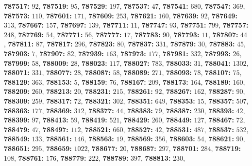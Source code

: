 \textsf{\bfseries 787517:} $92$, \textsf{\bfseries 787519:} $95$, \textsf{\bfseries 787529:} $197$, \textsf{\bfseries 787537:} $47$, \textsf{\bfseries 787541:} $680$, \textsf{\bfseries 787547:} $369$, \textsf{\bfseries 787573:} $110$, \textsf{\bfseries 787601:} $171$, \textsf{\bfseries 787609:} $253$, \textsf{\bfseries 787621:} $160$, \textsf{\bfseries 787639:} $92$, \textsf{\bfseries 787649:} $313$, \textsf{\bfseries 787667:} $157$, \textsf{\bfseries 787697:} $139$, \textsf{\bfseries 787711:} $11$, \textsf{\bfseries 787747:} $93$, \textsf{\bfseries 787751:} $799$, \textsf{\bfseries 787757:} $248$, \textsf{\bfseries 787769:} $54$, \textsf{\bfseries 787771:} $56$, \textsf{\bfseries 787777:} $17$, \textsf{\bfseries 787783:} $90$, \textsf{\bfseries 787793:} $11$, \textsf{\bfseries 787807:} $44$, \textsf{\bfseries 787811:} $87$, \textsf{\bfseries 787817:} $296$, \textsf{\bfseries 787823:} $80$, \textsf{\bfseries 787837:} $331$, \textsf{\bfseries 787879:} $30$, \textsf{\bfseries 787883:} $45$, \textsf{\bfseries 787903:} $7$, \textsf{\bfseries 787907:} $82$, \textsf{\bfseries 787939:} $163$, \textsf{\bfseries 787973:} $177$, \textsf{\bfseries 787981:} $332$, \textsf{\bfseries 787993:} $26$, \textsf{\bfseries 787999:} $58$, \textsf{\bfseries 788009:} $28$, \textsf{\bfseries 788023:} $117$, \textsf{\bfseries 788027:} $783$, \textsf{\bfseries 788033:} $31$, \textsf{\bfseries 788041:} $1302$, \textsf{\bfseries 788071:} $331$, \textsf{\bfseries 788077:} $28$, \textsf{\bfseries 788087:} $58$, \textsf{\bfseries 788089:} $271$, \textsf{\bfseries 788093:} $78$, \textsf{\bfseries 788107:} $75$, \textsf{\bfseries 788129:} $363$, \textsf{\bfseries 788153:} $5$, \textsf{\bfseries 788159:} $76$, \textsf{\bfseries 788167:} $209$, \textsf{\bfseries 788173:} $164$, \textsf{\bfseries 788189:} $160$, \textsf{\bfseries 788209:} $260$, \textsf{\bfseries 788213:} $20$, \textsf{\bfseries 788231:} $215$, \textsf{\bfseries 788261:} $92$, \textsf{\bfseries 788267:} $162$, \textsf{\bfseries 788287:} $90$, \textsf{\bfseries 788309:} $259$, \textsf{\bfseries 788317:} $72$, \textsf{\bfseries 788321:} $302$, \textsf{\bfseries 788351:} $649$, \textsf{\bfseries 788353:} $15$, \textsf{\bfseries 788357:} $507$, \textsf{\bfseries 788363:} $177$, \textsf{\bfseries 788369:} $312$, \textsf{\bfseries 788377:} $44$, \textsf{\bfseries 788383:} $79$, \textsf{\bfseries 788387:} $230$, \textsf{\bfseries 788393:} $42$, \textsf{\bfseries 788399:} $97$, \textsf{\bfseries 788413:} $59$, \textsf{\bfseries 788419:} $521$, \textsf{\bfseries 788429:} $260$, \textsf{\bfseries 788449:} $127$, \textsf{\bfseries 788467:} $72$, \textsf{\bfseries 788479:} $47$, \textsf{\bfseries 788497:} $112$, \textsf{\bfseries 788521:} $660$, \textsf{\bfseries 788527:} $42$, \textsf{\bfseries 788531:} $487$, \textsf{\bfseries 788537:} $532$, \textsf{\bfseries 788549:} $133$, \textsf{\bfseries 788561:} $146$, \textsf{\bfseries 788563:} $19$, \textsf{\bfseries 788569:} $356$, \textsf{\bfseries 788603:} $54$, \textsf{\bfseries 788621:} $90$, \textsf{\bfseries 788651:} $295$, \textsf{\bfseries 788659:} $1022$, \textsf{\bfseries 788677:} $20$, \textsf{\bfseries 788687:} $297$, \textsf{\bfseries 788701:} $284$, \textsf{\bfseries 788719:} $108$, \textsf{\bfseries 788761:} $176$, \textsf{\bfseries 788779:} $222$, \textsf{\bfseries 788789:} $397$, \textsf{\bfseries 788813:} $230$, 
